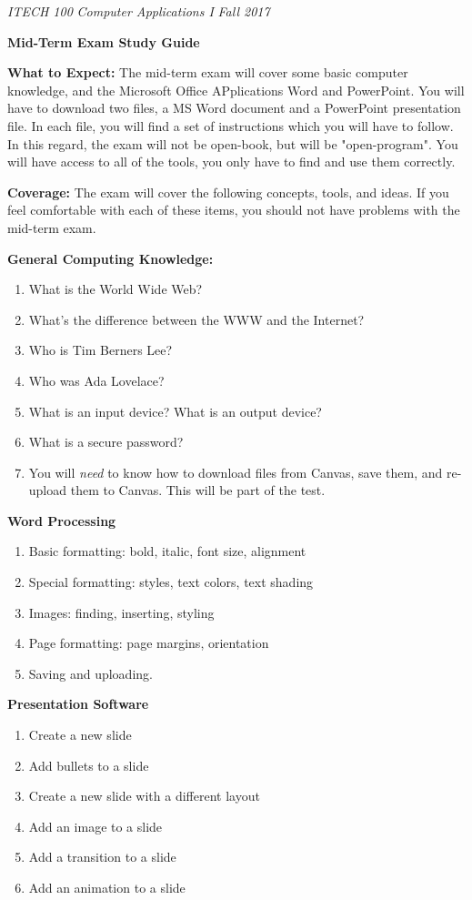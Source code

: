 \documentclass[a4paper, 11pt]{article}
\begin{document}
\noindent
\textit{ITECH 100} \hfill \textit{Computer Applications I} \hfill \textit{Fall 2017}
\begin{center}
\large\textbf{Mid-Term Exam Study Guide}
\end{center}

\large\textbf{What to Expect:}
The mid-term exam will cover some basic computer knowledge, and the Microsoft Office APplications Word and PowerPoint. You will have to download two files, a MS Word document and a PowerPoint presentation file. In each file, you will find a set of instructions which you will have to follow. In this regard, the exam will not be open-book, but will be "open-program". You will have access to all of the tools, you only have to find and use them correctly.

\large\textbf{Coverage:}
The exam will cover the following concepts, tools, and ideas. If you feel comfortable with each of these items, you should not have problems with the mid-term exam.

\large\textbf{General Computing Knowledge:}
\begin{enumerate}[noitemsep]
    \item What is the World Wide Web?
    \item What's the difference between the WWW and the Internet?
    \item Who is Tim Berners Lee?
    \item Who was Ada Lovelace?
    \item What is an input device? What is an output device?
    \item What is a secure password?
    \item You will \textit{need} to know how to download files from Canvas, save them, and re-upload them to Canvas. This will be part of the test.
\end{enumerate}

\large\textbf{Word Processing}
\begin{enumerate}[noitemsep]
    \item Basic formatting: bold, italic, font size, alignment
    \item Special formatting: styles, text colors, text shading
    \item Images: finding, inserting, styling
    \item Page formatting: page margins, orientation
    \item Saving and uploading.
\end{enumerate}

\large\textbf{Presentation Software}
\begin{enumerate}[noitemsep]
    \item Create a new slide
    \item Add bullets to a slide
    \item Create a new slide with a different layout
    \item Add an image to a slide
    \item Add a transition to a slide
    \item Add an animation to a slide
\end{enumerate}
\end{document}
